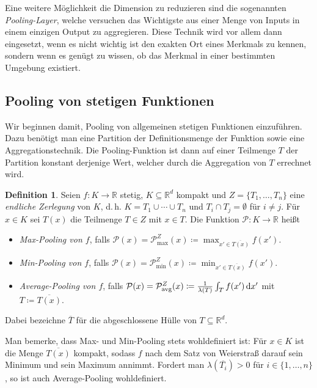 \documentclass[paper=a4, 	%
		fontsize=11pt,
		abstract=true, 	%
		headsepline, 	%
		notitlepage	%
		]{scrartcl}
\theoremstyle{definition}
\newtheorem{definition}[theorem]{Definition}
\newcommand{\R}{\mathbb{R}}
\newcommand{\diff}{\,\textrm{d}}
\newcommand{\avg}{\textnormal{avg}}
\begin{document}
Eine weitere Möglichkeit die Dimension zu reduzieren sind die sogenannten \emph{Pooling-Layer},
welche versuchen das Wichtigste aus einer Menge von Inputs in einem einzigen Output zu aggregieren.
Diese Technik wird vor allem dann eingesetzt, wenn es nicht wichtig ist den exakten Ort eines Merkmals zu kennen, sondern wenn es genügt zu wissen, ob das Merkmal in einer bestimmten Umgebung existiert.


\subsection{Pooling von stetigen Funktionen}

Wir beginnen damit, Pooling von allgemeinen stetigen Funktionen einzuführen.
Dazu benötigt man eine Partition der Definitionsmenge der Funktion sowie eine Aggregationstechnik.
Die Pooling-Funktion ist dann auf einer Teilmenge $T$ der Partition konstant derjenige Wert, welcher durch die Aggregation von $T$ errechnet wird. 

\begin{definition}
    Seien $f: K \rightarrow \R$ stetig, $K\subseteq \R^d$ kompakt und $Z=\{T_1,\dots, T_n\}$ eine \emph{endliche Zerlegung} von $K$, d.\,h. $K = T_1 \cup \cdots \cup T_n$ und $T_i \cap T_j = \emptyset$ für $i \neq j$.
    Für $x\in K$ sei $T(x)$ die Teilmenge $T\in Z$ mit $x\in T$.
    Die Funktion $\mathcal{P}: K\rightarrow \R$ heißt
    \begin{itemize}
        \item \emph{Max-Pooling von $f$}, falls $\mathcal{P}(x) = \mathcal{P}_{\max}^Z(x) \coloneqq \max_{x'\in \overline{T(x)}} f(x')$.
        \item \emph{Min-Pooling von $f$}, falls $\mathcal{P}(x) = \mathcal{P}_{\min}^Z(x) \coloneqq \min_{x'\in \overline{T(x)}} f(x')$.
        \item \emph{Average-Pooling von $f$}, falls $\mathcal{P}(x) = \mathcal{P}_{\avg}^Z(x) \coloneqq \frac{1}{\lambda(T)} \int_{T} f(x') \diff x'$ mit $T \coloneqq \overline{T(x)}$.
    \end{itemize}
    Dabei bezeichne $\overline{T}$ für die abgeschlossene Hülle von $T\subseteq \R^d$.
\end{definition}

Man bemerke, dass Max- und Min-Pooling stets wohldefiniert ist: Für $x\in K$ ist die Menge $\overline{T(x)}$ kompakt, sodass $f$ nach dem Satz von Weierstraß darauf sein Minimum und sein Maximum annimmt.
Fordert man $\lambda\left( \overline{T_i}\right) > 0$ für $i\in\{ 1, \dots, n\}$, so ist auch Average-Pooling wohldefiniert.
\end{document}
